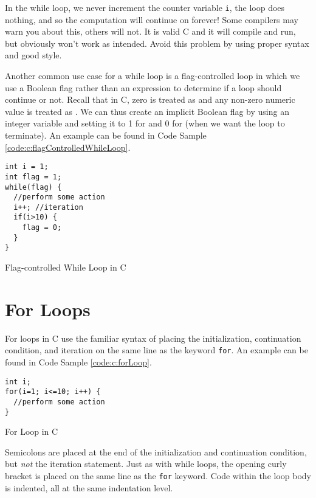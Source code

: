In the while loop, we never increment the counter variable \texttt{i}, 
the loop does nothing, and so the computation will continue on
forever!  Some compilers may warn you about this, others will not.  It
is valid C and it will compile and run, but obviously won't work as intended.
Avoid this problem by using proper syntax and good style.

Another common use case for a while loop is a flag-controlled loop in which
we use a Boolean flag rather than an expression to determine if a loop
should continue or not.  Recall that in C, zero is treated as \False and 
any non-zero numeric value is treated as \True.  We can thus create an
implicit Boolean flag by using an integer variable and setting it to 1 for
\True and 0 for \False (when we want the loop to terminate).  An example
can be found in Code Sample \ref{code:c:flagControlledWhileLoop}.

\begin{listing}
\begin{verbatim}
int i = 1;
int flag = 1;
while(flag) {
  //perform some action
  i++; //iteration  
  if(i>10) {
    flag = 0;
  }
}
\end{verbatim}
  \caption{Flag-controlled While Loop in C}
  \label{code:c:flagControlledWhileLoop}
\end{listing}

\section{For Loops}

For loops in C use the familiar syntax of placing the initialization, continuation
condition, and iteration on the same line as the keyword \texttt{for}.
An example can be found in Code Sample \ref{code:c:forLoop}.

\begin{listing}[!h]
\begin{verbatim}
int i;
for(i=1; i<=10; i++) {
  //perform some action
}
\end{verbatim}
  \caption{For Loop in C}
  \label{code:c:forLoop}
\end{listing}

Semicolons are placed at the end of the initialization and
continuation condition, but \emph{not} the iteration statement.  Just as with while
loops, the opening curly bracket is placed on the same line as the \texttt{for}
keyword.  Code within the loop body is indented, all at the same indentation level.

